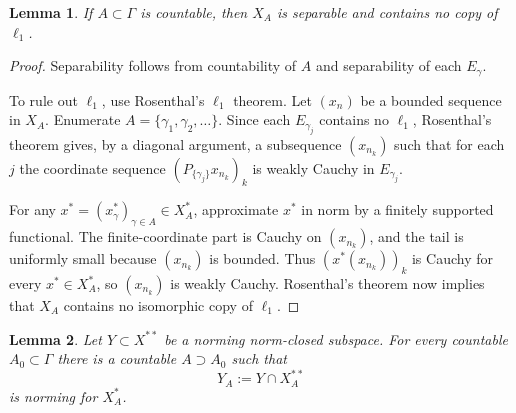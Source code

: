\documentclass[11pt]{article}
\newtheorem{lemma}{Lemma}
\begin{document}
\begin{lemma}\label{lem:countable-no-l1}
If $A\subset\Gamma$ is countable, then $X_A$ is separable and contains no copy
of $\ell_1$.
\end{lemma}

\begin{proof}
Separability follows from countability of $A$ and separability of each
$E_\gamma$.

To rule out $\ell_1$, use Rosenthal's $\ell_1$ theorem.  Let $(x_n)$ be a
bounded sequence in $X_A$.  Enumerate $A=\{\gamma_1,\gamma_2,\ldots\}$.  Since
each $E_{\gamma_j}$ contains no $\ell_1$, Rosenthal's theorem gives, by a
diagonal argument, a subsequence $(x_{n_k})$ such that for each $j$ the
coordinate sequence $(P_{\{\gamma_j\}}x_{n_k})_k$ is weakly Cauchy in
$E_{\gamma_j}$.

For any $x^*=(x_\gamma^*)_{\gamma\in A}\in X_A^*$, approximate $x^*$ in norm
by a finitely supported functional.  The finite-coordinate part is Cauchy on
$(x_{n_k})$, and the tail is uniformly small because $(x_{n_k})$ is bounded.
Thus $(x^*(x_{n_k}))_k$ is Cauchy for every $x^*\in X_A^*$, so $(x_{n_k})$ is
weakly Cauchy.  Rosenthal's theorem now implies that $X_A$ contains no
isomorphic copy of $\ell_1$.
\end{proof}

\begin{lemma}\label{lem:localization}
Let $Y\subset X^{**}$ be a norming norm-closed subspace.  For every countable
$A_0\subset\Gamma$ there is a countable $A\supset A_0$ such that
\[
Y_A:=Y\cap X_A^{**}
\]
is norming for $X_A^*$.
\end{lemma}
\end{document}
